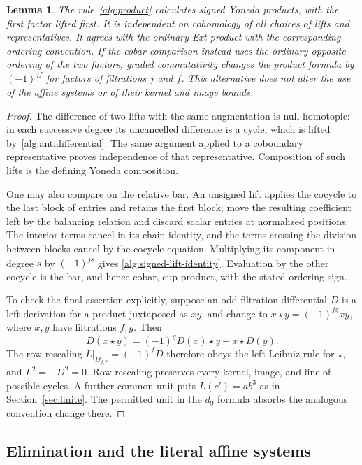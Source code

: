 \documentclass[11pt]{article}
\newtheorem{lemma}[theorem]{Lemma}
\theoremstyle{definition}
\theoremstyle{remark}
\numberwithin{equation}{section}
\begin{document}
\begin{lemma}\label{alg:product-conventions}
The rule~\eqref{alg:product} calculates signed Yoneda products, with
the first factor lifted first.  It is independent on cohomology of all
choices of lifts and representatives.  It agrees with the ordinary Ext
product with the corresponding ordering convention.  If the cobar
comparison instead uses the ordinary opposite ordering of the two
factors, graded commutativity changes the product formula by
$(-1)^{jf}$ for factors of filtrations $j$ and $f$.
This alternative does not alter the use of the affine
systems or of their kernel and image bounds.
\end{lemma}

\begin{proof}
The difference of two lifts with the same augmentation is null
homotopic: in each successive degree its uncancelled difference is a
cycle, which is lifted by~\eqref{alg:antidifferential}.  The same
argument applied to a coboundary representative proves independence
of that representative.  Composition of such lifts is the defining
Yoneda composition.

One may also compare on the relative bar.  An unsigned lift applies
the cocycle to the last block of entries and retains the first block;
move the resulting coefficient left by the balancing relation and
discard scalar entries at normalized positions.  The interior terms
cancel in its chain identity, and the terms crossing the division
between blocks cancel by the cocycle equation.  Multiplying its
component in degree $s$ by $(-1)^{js}$ gives
\eqref{alg:signed-lift-identity}.  Evaluation by the other cocycle is
the bar, and hence cobar, cup product, with the stated ordering sign.

To check the final assertion explicitly, suppose an odd-filtration
differential $D$ is a left derivation for a product juxtaposed as $xy$,
and change to $x\star y=(-1)^{fg}xy$, where $x,y$ have filtrations
$f,g$.  Then
\[
 D(x\star y)=(-1)^gD(x)\star y+x\star D(y).
\]
The row rescaling $L|_{D_{f,*}}=(-1)^fD$ therefore obeys the left
Leibniz rule for $\star$, and $L^2=-D^2=0$.  Row rescaling preserves
every kernel, image, and line of possible cycles.  A further common
unit puts $L(c')=ab^3$ as in Section~\ref{sec:finite}.
The permitted unit in the $d_9$ formula absorbs the analogous convention
change there.
\end{proof}

\subsection{Elimination and the literal affine systems}
\end{document}
